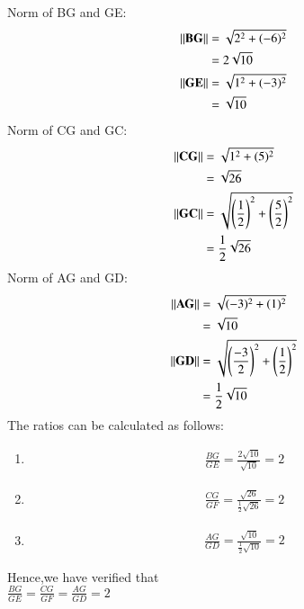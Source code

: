 \documentclass[journal,12pt,onecolumn]{IEEEtran}
\theoremstyle{remark}
\begin{document}
Norm of BG and GE:
\begin{align}
\left\lVert\mathbf{BG}\right\rVert&=\sqrt{2^2+(-6)^2}\\
               &=2\sqrt{10}\\
\left\lVert\mathbf{GE}\right\rVert&=\sqrt{1^2+(-3)^2}\\
               &=\sqrt{10}
\end{align}
Norm of CG and GC:\\
\begin{align}
\left\lVert\mathbf{CG}\right\rVert&=\sqrt{1^2+(5)^2}\\
               &=\sqrt{26}\\
\left\lVert\mathbf{GC}\right\rVert&=\sqrt{\left(\frac{1}{2}\right)^2+\left(\frac{5}{2}\right)^2}\\
               &=\frac{1}{2}\sqrt{26}
\end{align}
Norm of AG and GD:\\
\begin{align}
\left\lVert\mathbf{AG}\right\rVert&=\sqrt{(-3)^2+(1)^2}\\
               &=\sqrt{10}\\
\left\lVert\mathbf{GD}\right\rVert&=\sqrt{\left(\frac{-3}{2}\right)^2+\left(\frac{1}{2}\right)^2}\\
               &=\frac{1}{2}\sqrt{10}
\end{align}
The ratios can be calculated as follows:\\
\begin{enumerate} 
\item
\begin{align}
\frac{BG}{GE} =\frac{2\sqrt{10}}{\sqrt{10}}=2
\end{align}
\item 
\begin{align}
\frac{CG}{GF}=\frac{\sqrt{26}}{\frac{1}{2}\sqrt{26}}=2
\end{align}
\item 
\begin{align}
\frac{AG}{GD}=\frac{\sqrt{10}}{\frac{1}{2}\sqrt{10}}=2
\end{align}
\end{enumerate}
Hence,we have verified that \\
$\frac{BG}{GE}=\frac{CG}{GF}=\frac{AG}{GD}=2$
\end{document}
